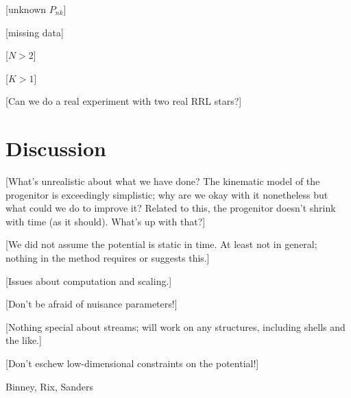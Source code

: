 \documentclass[letterpaper,12pt,preprint]{aastex}
\begin{document}
[unknown $P_{nk}$]

[missing data]

[$N>2$]

[$K>1$]

[Can we do a real experiment with two real RRL stars?]

\section{Discussion}

[What's unrealistic about what we have done?  The kinematic model of
  the progenitor is exceedingly simplistic; why are we okay with it
  nonetheless but what could we do to improve it?  Related to this,
  the progenitor doesn't shrink with time (as it should).  What's up
  with that?]

[We did not assume the potential is static in time.  At least not in
  general; nothing in the method requires or suggests this.]

[Issues about computation and scaling.]

[Don't be afraid of nuisance parameters!]

[Nothing special about streams; will work on any structures, including
  shells and the like.]

[Don't eschew low-dimensional constraints on the potential!]

\acknowledgements
Binney, Rix, Sanders
\end{document}
